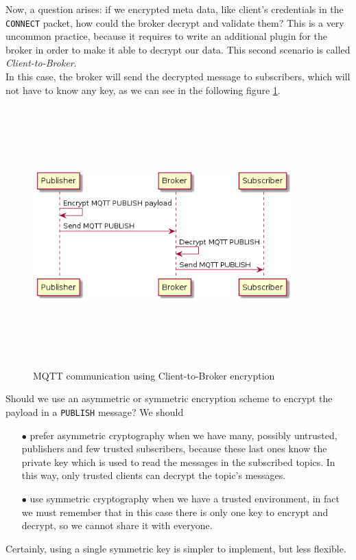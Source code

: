 \documentclass[12pt]{report}
\begin{document}
{{Now, a question arises: if we encrypted meta data, like client's credentials in the \texttt{CONNECT} packet, how could the broker decrypt and validate them?
This is a very uncommon practice, because it requires to write an additional plugin for the broker in order to make it able to decrypt our data. 
This second scenario is called \emph{Client-to-Broker}.\\
In this case, the broker will send the decrypted message to subscribers, which will not have to know any key, as we can see in the following figure \ref{fig:mqttclienttobroker}.

\begin{figure}[H]
\includegraphics[width=10cm,height=10cm,keepaspectratio]{client_to_broker}
\centering
\caption{MQTT communication using Client-to-Broker encryption}
\label{fig:mqttclienttobroker}
\end{figure}

Should we use an asymmetric or symmetric encryption scheme to encrypt the payload in a \texttt{PUBLISH} message? We should

\begin{itemize}
\setlength{\itemindent}{+4mm}
\item[$\bullet$] prefer asymmetric cryptography when we have many, possibly untrusted, publishers and few trusted subscribers, because these last ones know the private key which is used to read the messages in the subscribed topics.
In this way, only trusted clients can decrypt the topic's messages.
\item[$\bullet$] use symmetric cryptography when we have a trusted environment, in fact we must remember that in this case there is only one key to encrypt and decrypt, so we cannot share it with everyone.
\end{itemize}
\bigskip
Certainly, using a single symmetric key is simpler to implement, but less flexible.\\

}}
\end{document}
